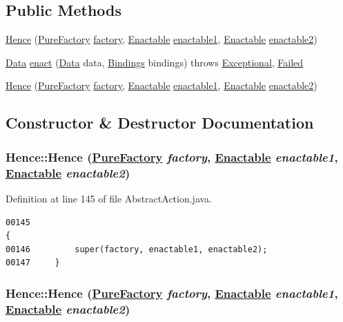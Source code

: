 \subsection*{Public Methods}
\begin{CompactItemize}
\item 
\hyperlink{classHence_a0}{Hence} (\hyperlink{classPureFactory}{Pure\-Factory} \hyperlink{classDataImpl_o0}{factory}, \hyperlink{interfaceEnactable}{Enactable} \hyperlink{classAbstractInfixCombinator_o0}{enactable1}, \hyperlink{interfaceEnactable}{Enactable} \hyperlink{classAbstractInfixCombinator_o1}{enactable2})
\item 
\hyperlink{interfaceData}{Data} \hyperlink{classHence_a1}{enact} (\hyperlink{interfaceData}{Data} data, \hyperlink{interfaceBindings}{Bindings} bindings) throws \hyperlink{classExceptional}{Exceptional}, \hyperlink{classFailed}{Failed}
\item 
\hyperlink{classHence_a2}{Hence} (\hyperlink{classPureFactory}{Pure\-Factory} \hyperlink{classDataImpl_o0}{factory}, \hyperlink{interfaceEnactable}{Enactable} \hyperlink{classAbstractInfixCombinator_o0}{enactable1}, \hyperlink{interfaceEnactable}{Enactable} \hyperlink{classAbstractInfixCombinator_o1}{enactable2})
\end{CompactItemize}


\subsection{Constructor \& Destructor Documentation}
\hypertarget{classHence_a0}{
\subsubsection[Hence]{\setlength{\rightskip}{0pt plus 5cm}Hence::Hence (\hyperlink{classPureFactory}{Pure\-Factory} {\em factory}, \hyperlink{interfaceEnactable}{Enactable} {\em enactable1}, \hyperlink{interfaceEnactable}{Enactable} {\em enactable2})}}
\label{classHence_a0}




Definition at line 145 of file Abstract\-Action.java.\footnotesize\begin{verbatim}00145                                                                                   {
00146         super(factory, enactable1, enactable2);
00147     }
\end{verbatim}\normalsize 
\hypertarget{classHence_a2}{
\subsubsection[Hence]{\setlength{\rightskip}{0pt plus 5cm}Hence::Hence (\hyperlink{classPureFactory}{Pure\-Factory} {\em factory}, \hyperlink{interfaceEnactable}{Enactable} {\em enactable1}, \hyperlink{interfaceEnactable}{Enactable} {\em enactable2})}}
\label{classHence_a2}




